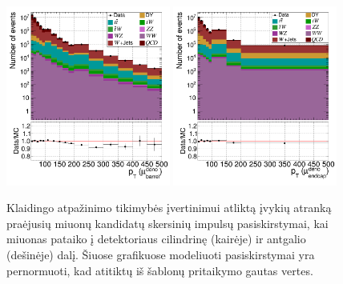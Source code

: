 \documentclass[a4paper, 12pt, oneside]{article}
\begin{document}
\begin{figure}[H]
	\includegraphics[width=0.48\textwidth]{Kursinis3/FRfit_pT_deno_barrel.png}
	\includegraphics[width=0.48\textwidth]{Kursinis3/FRfit_pT_deno_endcap.png}
	\caption{\label{fig:jet_pT_after}
		Klaidingo atpažinimo tikimybės įvertinimui atliktą įvykių atranką praėjusių miuonų kandidatų skersinių impulsų
		pasiskirstymai, kai miuonas pataiko į detektoriaus cilindrinę (kairėje) ir antgalio (dešinėje) dalį.
		Šiuose grafikuose modeliuoti pasiskirstymai yra pernormuoti, kad atitiktų iš šablonų pritaikymo gautas vertes.}
\end{figure}
\end{document}
